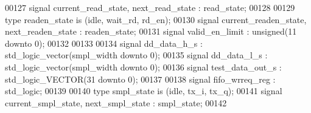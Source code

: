 \begin{DoxyCode}
00127   \textcolor{keywordflow}{signal} \textcolor{vhdlchar}{current_read_state}\textcolor{vhdlchar}{,} \textcolor{vhdlchar}{next_read_state} \textcolor{vhdlchar}{:}  \textcolor{vhdlchar}{read_state}; 
00128   
00129   \textcolor{keywordflow}{type} \textcolor{vhdlchar}{readen_state} \textcolor{keywordflow}{is} \textcolor{vhdlchar}{(}\textcolor{vhdlchar}{idle}\textcolor{vhdlchar}{,} \textcolor{vhdlchar}{wait\_rd}\textcolor{vhdlchar}{,} \textcolor{vhdlchar}{rd\_en}\textcolor{vhdlchar}{)};
00130   \textcolor{keywordflow}{signal} \textcolor{vhdlchar}{current_readen_state}\textcolor{vhdlchar}{,} \textcolor{vhdlchar}{next_readen_state} \textcolor{vhdlchar}{:}  \textcolor{vhdlchar}{readen_state}; 
00131   \textcolor{keywordflow}{signal} \textcolor{vhdlchar}{valid_en_limit}      \textcolor{vhdlchar}{:} \textcolor{comment}{unsigned}\textcolor{vhdlchar}{(}\textcolor{vhdllogic}{}\textcolor{vhdllogic}{11} \textcolor{keywordflow}{downto} \textcolor{vhdllogic}{}\textcolor{vhdllogic}{0}\textcolor{vhdlchar}{)};
00132   
00133   
00134     \textcolor{keywordflow}{signal} \textcolor{vhdlchar}{dd_data_h_s}       \textcolor{vhdlchar}{:} \textcolor{comment}{std\_logic\_vector}\textcolor{vhdlchar}{(}\textcolor{vhdlchar}{smpl_width} \textcolor{keywordflow}{downto} \textcolor{vhdllogic}{}\textcolor{vhdllogic}{0}\textcolor{vhdlchar}{)};
00135     \textcolor{keywordflow}{signal} \textcolor{vhdlchar}{dd_data_l_s}       \textcolor{vhdlchar}{:} \textcolor{comment}{std\_logic\_vector}\textcolor{vhdlchar}{(}\textcolor{vhdlchar}{smpl_width} \textcolor{keywordflow}{downto} \textcolor{vhdllogic}{}\textcolor{vhdllogic}{0}\textcolor{vhdlchar}{)};
00136     \textcolor{keywordflow}{signal} \textcolor{vhdlchar}{test_data_out_s}   \textcolor{vhdlchar}{:} \textcolor{comment}{std\_logic\_VECTOR}\textcolor{vhdlchar}{(}\textcolor{vhdllogic}{}\textcolor{vhdllogic}{31} \textcolor{keywordflow}{downto} \textcolor{vhdllogic}{}\textcolor{vhdllogic}{0}\textcolor{vhdlchar}{)};
00137 
00138     \textcolor{keywordflow}{signal} \textcolor{vhdlchar}{fifo_wrreq_reg}       \textcolor{vhdlchar}{:} \textcolor{comment}{std\_logic};
00139   
00140   \textcolor{keywordflow}{type} \textcolor{vhdlchar}{smpl_state} \textcolor{keywordflow}{is} \textcolor{vhdlchar}{(}\textcolor{vhdlchar}{idle}\textcolor{vhdlchar}{,} \textcolor{vhdlchar}{tx\_i}\textcolor{vhdlchar}{,} \textcolor{vhdlchar}{tx\_q}\textcolor{vhdlchar}{)};
00141   \textcolor{keywordflow}{signal} \textcolor{vhdlchar}{current_smpl_state}\textcolor{vhdlchar}{,} \textcolor{vhdlchar}{next_smpl_state} \textcolor{vhdlchar}{:}  \textcolor{vhdlchar}{smpl_state}; 
00142 

\end{DoxyCode}
